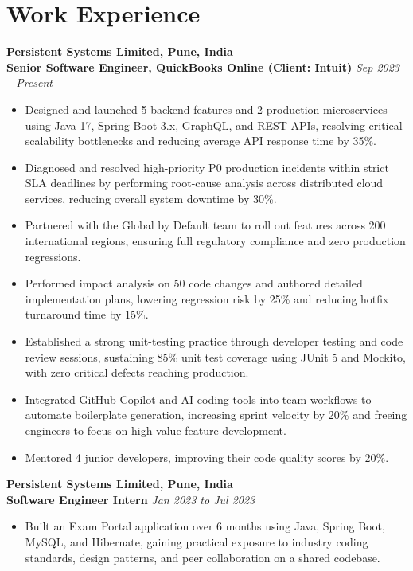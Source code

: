 \documentclass[10pt, letterpaper]{article}
\begin{document}
\section{Work Experience}

\textbf{Persistent Systems Limited, Pune, India} \\
\textbf{Senior Software Engineer, QuickBooks Online (Client: Intuit)} \hfill \textit{Sep 2023 -- Present}
\begin{itemize}[leftmargin=0.2in, itemsep=1pt, parsep=0pt, topsep=2pt]
    \item Designed and launched 5 backend features and 2 production microservices using Java 17, Spring Boot 3.x, GraphQL, and REST APIs, resolving critical scalability bottlenecks and reducing average API response time by 35\%.
    \item Diagnosed and resolved high-priority P0 production incidents within strict SLA deadlines by performing root-cause analysis across distributed cloud services, reducing overall system downtime by 30\%.
    \item Partnered with the Global by Default team to roll out features across 200 international regions, ensuring full regulatory compliance and zero production regressions.
    \item Performed impact analysis on 50 code changes and authored detailed implementation plans, lowering regression risk by 25\% and reducing hotfix turnaround time by 15\%.
    \item Established a strong unit-testing practice through developer testing and code review sessions, sustaining 85\% unit test coverage using JUnit 5 and Mockito, with zero critical defects reaching production.
    \item Integrated GitHub Copilot and AI coding tools into team workflows to automate boilerplate generation, increasing sprint velocity by 20\% and freeing engineers to focus on high-value feature development.
    \item Mentored 4 junior developers, improving their code quality scores by 20\%.
\end{itemize}

\textbf{Persistent Systems Limited, Pune, India} \\
\textbf{Software Engineer Intern} \hfill \textit{Jan 2023 to Jul 2023}
\begin{itemize}[leftmargin=0.2in, itemsep=1pt, parsep=0pt, topsep=2pt]
    \item Built an Exam Portal application over 6 months using Java, Spring Boot, MySQL, and Hibernate, gaining practical exposure to industry coding standards, design patterns, and peer collaboration on a shared codebase.
\end{itemize}
\end{document}
